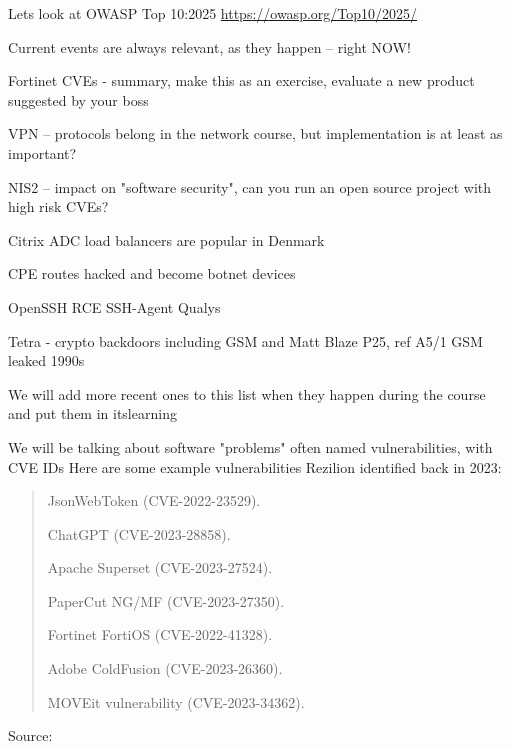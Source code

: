 \documentclass[Screen16to9,17pt]{foils}
\begin{document}
Lets look at OWASP Top 10:2025 \url{https://owasp.org/Top10/2025/}


Current events are always relevant, as they happen -- right NOW!
\begin{list2}
\item Fortinet CVEs - summary, make this as an exercise, evaluate a new product suggested by your boss
\item VPN -- protocols belong in the network course, but implementation is at least as important?
\item NIS2 -- impact on "software security", can you run an open source project with high risk CVEs?
\item Citrix ADC load balancers are popular in Denmark
\item CPE routes hacked and become botnet devices
\item OpenSSH RCE SSH-Agent Qualys
\item Tetra - crypto backdoors including GSM and Matt Blaze P25, ref A5/1 GSM leaked 1990s
\end{list2}

We will add more recent ones to this list when they happen during the course and put them in itslearning


We will be talking about software "problems" often named vulnerabilities, with CVE IDs
Here are some example vulnerabilities Rezilion identified back in 2023:
\begin{quote}
\begin{list2}
\item JsonWebToken (CVE-2022-23529).
\item ChatGPT (CVE-2023-28858).
\item Apache Superset (CVE-2023-27524).
\item PaperCut NG/MF (CVE-2023-27350).
\item Fortinet FortiOS (CVE-2022-41328).
\item Adobe ColdFusion (CVE-2023-26360).
\item MOVEit vulnerability (CVE-2023-34362).
\end{list2}
\end{quote}

Source:\\ {\scriptsize
{}}
\end{document}
